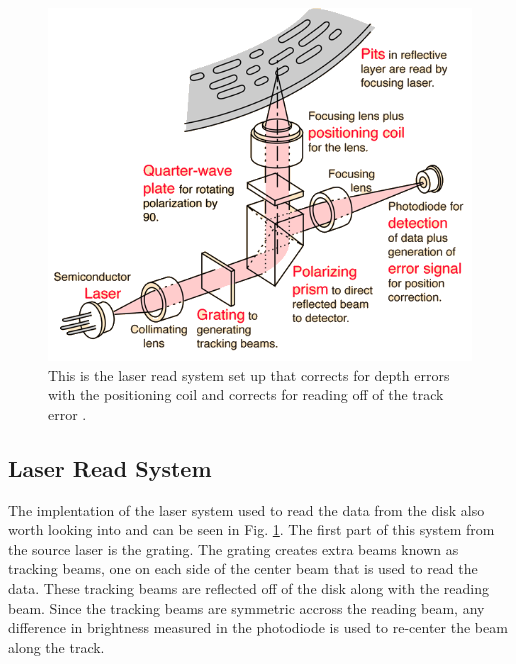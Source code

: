 \documentclass[ notitlepage, numerical, 11pt]{revtex4-1} %
\begin{document}
\begin{figure}[H]
\centerline{\includegraphics[scale=.6]{cdPlay.png}}
\caption{This is the laser read system set up that corrects for depth errors with the positioning coil and corrects for reading off of the track error \cite{hyper}.}
\label{cdPlay}
\end{figure} 

\subsection{Laser Read System}

The implentation of the laser system used to read the data from the disk also worth looking into and can be seen in Fig. \ref{cdPlay}. The first part of this system from the source laser is the grating. The grating creates extra beams known as tracking beams, one on each side of the center beam that is used to read the data. These tracking beams are reflected off of the disk along with the reading beam. Since the tracking beams are symmetric accross the reading beam, any difference in brightness measured in the photodiode is used to re-center the beam along the track. 
\end{document}
